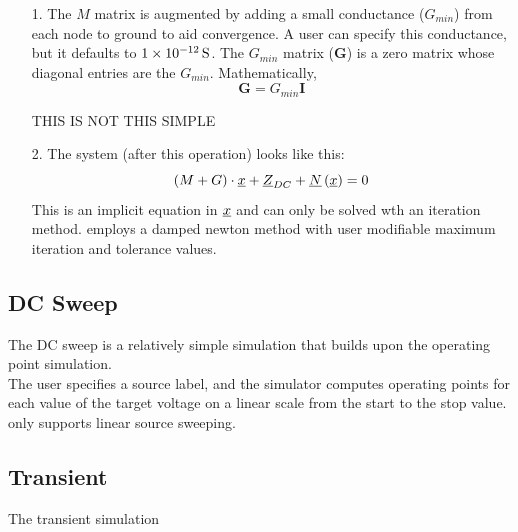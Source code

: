 \begin{enumerate}
    \item[1.] The $M$ matrix is augmented by adding a small conductance ($G_{min}$) from each node to ground to aid convergence. A user can specify this conductance, but it defaults to $\SI{1d-12}{\siemens}$. The $G_{min}$ matrix ($\mathbf{G}$) is a zero matrix whose diagonal entries are the $G_{min}$. Mathematically, \[ \mathbf{G} = G_{min}\mathbf{I}\]
    
    THIS IS NOT THIS SIMPLE
    \item[2.] The system (after this operation) looks like this: \[ \left(M + G \right)\cdot \underline{x} + \underline{Z}_{DC} +  \underline{N}\left(\underline{x} \right) = 0\]
    This is an implicit equation in $\underline{x}$ and can only be solved wth an iteration method. \turmeric employs a damped newton method with user modifiable maximum iteration and tolerance values. 
\end{enumerate}

\subsection{DC Sweep}
The DC sweep is a relatively simple simulation that builds upon the operating point simulation.\\

The user specifies a source label, and the simulator computes operating points for each value of the target voltage on a linear scale from the start to the stop value. \turmeric only supports linear source sweeping.

\subsection{Transient}
The transient simulation 


